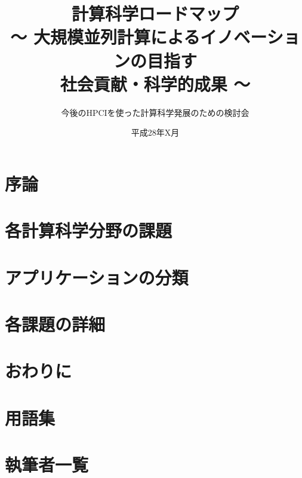 \documentclass[11pt,a4paper]{jsbook}
\begin{document}
\title{計算科学ロードマップ\\
〜 大規模並列計算によるイノベーションの目指す\\
社会貢献・科学的成果 〜}
\author{今後のHPCIを使った計算科学発展のための検討会}
\date{平成28年X月}
\maketitle

\tableofcontents

\mainmatter

\chapter{序論}

\chapter{各計算科学分野の課題}

\chapter{アプリケーションの分類}

\chapter{各課題の詳細}

\chapter{おわりに}
%

\appendix
\chapter{用語集}


\chapter{執筆者一覧}

\end{document}
